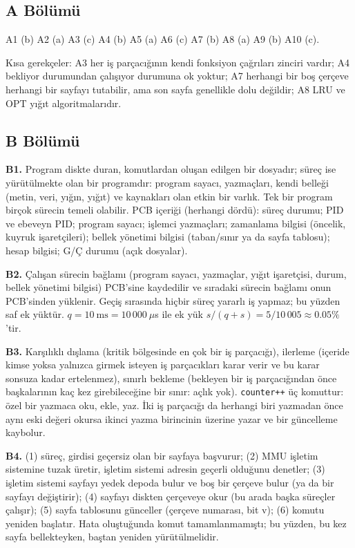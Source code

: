 \subsection*{A Bölümü}
A1 (b) \quad A2 (a) \quad A3 (c) \quad A4 (b) \quad A5 (a) \quad A6 (c) \quad A7 (b) \quad A8 (a) \quad A9 (b) \quad A10 (c).

Kısa gerekçeler: A3 her iş parçacığının kendi fonksiyon çağrıları zinciri vardır; A4 bekliyor durumundan çalışıyor durumuna ok yoktur; A7 herhangi bir boş çerçeve herhangi bir sayfayı tutabilir, ama son sayfa genellikle dolu değildir; A8 LRU ve OPT yığıt algoritmalarıdır.

\subsection*{B Bölümü}
\textbf{B1.} Program diskte duran, komutlardan oluşan edilgen bir dosyadır; süreç ise yürütülmekte olan bir programdır: program sayacı, yazmaçları, kendi belleği (metin, veri, yığın, yığıt) ve kaynakları olan etkin bir varlık. Tek bir program birçok sürecin temeli olabilir. PCB içeriği (herhangi dördü): süreç durumu; PID ve ebeveyn PID; program sayacı; işlemci yazmaçları; zamanlama bilgisi (öncelik, kuyruk işaretçileri); bellek yönetimi bilgisi (taban/sınır ya da sayfa tablosu); hesap bilgisi; G/Ç durumu (açık dosyalar).

\textbf{B2.} Çalışan sürecin bağlamı (program sayacı, yazmaçlar, yığıt işaretçisi, durum, bellek yönetimi bilgisi) PCB'sine kaydedilir ve sıradaki sürecin bağlamı onun PCB'sinden yüklenir. Geçiş sırasında hiçbir süreç yararlı iş yapmaz; bu yüzden saf ek yüktür. $q = 10\ \text{ms} = 10\,000\ \mu$s ile ek yük $s/(q+s) = 5/10\,005 \approx 0.05\%$'tir.

\textbf{B3.} Karşılıklı dışlama (kritik bölgesinde en çok bir iş parçacığı), ilerleme (içeride kimse yoksa yalnızca girmek isteyen iş parçacıkları karar verir ve bu karar sonsuza kadar ertelenmez), sınırlı bekleme (bekleyen bir iş parçacığından önce başkalarının kaç kez girebileceğine bir sınır: açlık yok). \texttt{counter++} üç komuttur: özel bir yazmaca oku, ekle, yaz. İki iş parçacığı da herhangi biri yazmadan önce aynı eski değeri okursa ikinci yazma birincinin üzerine yazar ve bir güncelleme kaybolur.

\textbf{B4.} (1) süreç, girdisi geçersiz olan bir sayfaya başvurur; (2) MMU işletim sistemine tuzak üretir, işletim sistemi adresin geçerli olduğunu denetler; (3) işletim sistemi sayfayı yedek depoda bulur ve boş bir çerçeve bulur (ya da bir sayfayı değiştirir); (4) sayfayı diskten çerçeveye okur (bu arada başka süreçler çalışır); (5) sayfa tablosunu günceller (çerçeve numarası, bit v); (6) komutu yeniden başlatır. Hata oluştuğunda komut tamamlanmamıştı; bu yüzden, bu kez sayfa bellekteyken, baştan yeniden yürütülmelidir.

